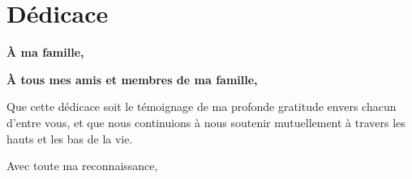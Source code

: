 
\chapter*{\hspace{2cm}Dédicace}

\vspace{-2cm}
\begin{fquote}

\begin{center}

\textbf{À ma famille,}


\textbf{À tous mes amis et membres de ma famille,} 

Que cette dédicace soit le témoignage de ma profonde gratitude envers chacun d'entre vous, et que nous continuions à nous soutenir mutuellement à travers les hauts et les bas de la vie.

Avec toute ma reconnaissance,

\end{center}

\end{fquote}

\restoregeometry

\clearpage

